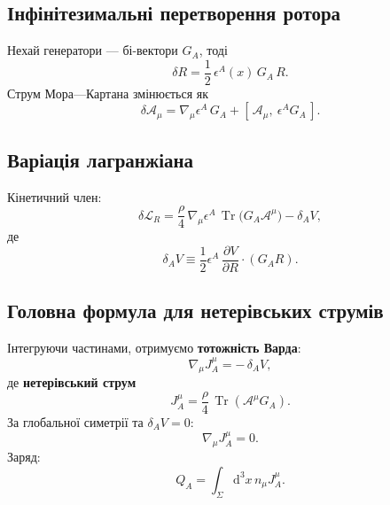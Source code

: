 \documentclass[11pt,a4paper]{article}
\numberwithin{equation}{section}
\theoremstyle{plain}
\theoremstyle{definition}
\theoremstyle{remark}
\DeclareMathOperator{\Tr}{Tr}
\newcommand{\dd}{\mathrm{d}}
\begin{document}
\subsection{Інфінітезимальні перетворення ротора}

Нехай генератори — бі-вектори $G_A$, тоді
\begin{equation}
\delta R = \frac{1}{2}\,\epsilon^A(x)\,G_A\,R.
\label{eq:deltaR}
\end{equation}
Струм Мора—Картана змінюється як
\begin{equation}
\delta \mathcal{A}_\mu = \nabla_\mu\epsilon^A\, G_A + [\,\mathcal{A}_\mu,\ \epsilon^A G_A\,].
\label{eq:deltaA}
\end{equation}

\subsection{Варіація лагранжіана}

Кінетичний член:
\begin{equation}
\delta \mathcal{L}_R = \frac{\rho}{4}\, \nabla_\mu \epsilon^A \,\Tr\!\big(G_A\mathcal{A}^\mu\big) - \delta_A V,
\label{eq:deltaL}
\end{equation}
де
\begin{equation}
\delta_A V \equiv \frac{1}{2}\epsilon^A\,\frac{\partial V}{\partial R}\cdot (G_A R).
\end{equation}

\subsection{Головна формула для нетерівських струмів}

Інтегруючи частинами, отримуємо \textbf{тотожність Варда}:
\begin{equation}
\nabla_\mu J^\mu_A = -\,\delta_A V,
\label{eq:ward}
\end{equation}
де \textbf{нетерівський струм}
\begin{equation}
J^\mu_A = \frac{\rho}{4}\,\Tr(\mathcal{A}^\mu G_A).
\label{eq:J_general}
\end{equation}
За глобальної симетрії та $\delta_A V=0$:
\begin{equation}
\nabla_\mu J^\mu_A = 0.
\label{eq:conserved}
\end{equation}
Заряд:
\begin{equation}
Q_A = \int_\Sigma \dd^3x\, n_\mu J^\mu_A.
\label{eq:charge}
\end{equation}
\end{document}
